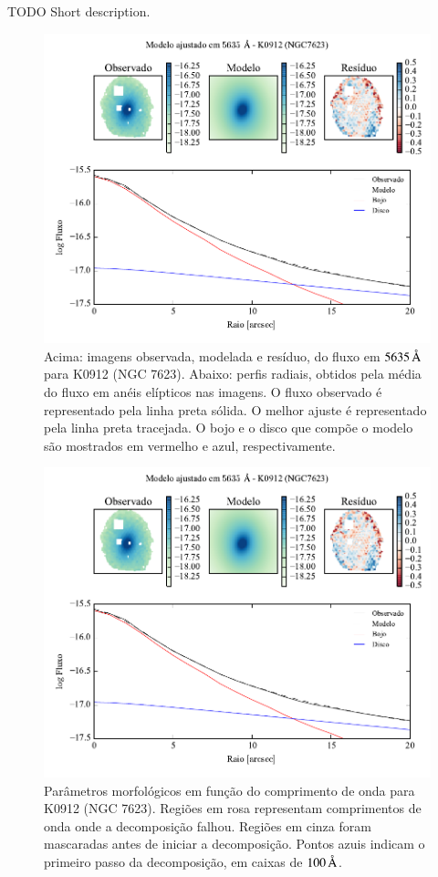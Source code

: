 TODO Short description.

\begin{figure}
	\includegraphics[page=1]{figuras-decomp/K0912_sample006a}
	\caption[Ajuste morfológico em $5635\,\angstrom$ de K0912 (NGC 7623)]
	{Acima: imagens observada, modelada e resíduo, do fluxo em $5635\,\angstrom$
	para K0912 (NGC 7623). Abaixo: perfis radiais, obtidos pela média do fluxo em
	anéis elípticos nas imagens. O fluxo observado é representado pela linha preta
	sólida. O melhor ajuste é representado pela linha preta tracejada. O bojo e o
	disco que compõe o modelo são mostrados em vermelho e azul, respectivamente.}
	\label{fig:decompRadprof:K0912}
\end{figure}

\begin{figure}
	\includegraphics[page=2]{figuras-decomp/K0912_sample006a}
	\caption[Parâmetros morfológicos em função do comprimento de onda de K0912
	(NGC 7623)]
	{Parâmetros morfológicos em função do comprimento de onda para
	K0912 (NGC 7623). Regiões em rosa representam comprimentos de onda onde a
	decomposição falhou. Regiões em cinza foram mascaradas antes de iniciar a
	decomposição. Pontos azuis indicam o primeiro passo da decomposição, em caixas
	de $100\,\text{\normalfont\AA}$.}
	\label{fig:decompParams:K0912}
\end{figure}

